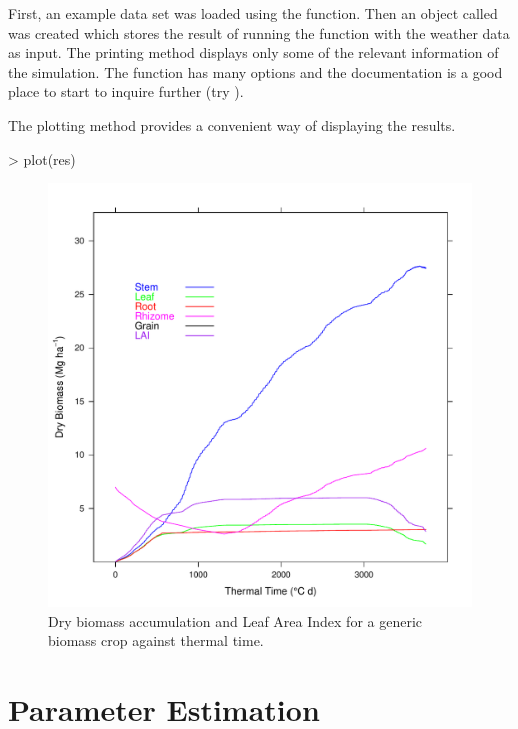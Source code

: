 \documentclass[12pt]{article}
\begin{document}
First, an example data set was loaded using the 
function. Then an object called  was created which stores
the result of running the function  with the weather data
as input. The printing method displays only some of the relevant
information of the simulation. The function  has many
options and the documentation is a good place to start to inquire
further (try ).

The plotting method provides a convenient way of displaying the results.

\begin{Schunk}
\begin{Sinput}
> plot(res)
\end{Sinput}
\end{Schunk}
\begin{figure}[htbp!]
  \centering
  \includegraphics[scale=0.8]{./figs/BioCro-plotBioGro.pdf}
  \caption{Dry biomass accumulation and Leaf Area Index for a generic biomass crop against thermal time.}
  \label{fig:plotBioGro}
\end{figure}

\section{Parameter Estimation}
\end{document}
